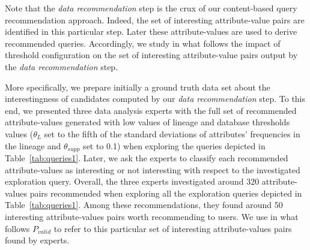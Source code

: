      \begin{table}[t]
 \centering
{}
 \caption{Set of thresholds settings}
 \label{tab:thresh-config}
 \end{table}

Note that the \emph{data recommendation} step is the crux of our content-based query recommendation approach. Indeed, the set of interesting attribute-value pairs  are  identified in this particular step. Later these attribute-values are used to derive recommended queries.
Accordingly, we study in what follows the impact of threshold configuration on the set of interesting attribute-value pairs output by the \emph{data recommendation} step.


More specifically, we prepare initially a ground truth data set about the interestingness of candidates computed by our \emph{data recommendation} step. To this end, we presented three data analysis experts with the full set of recommended attribute-values generated with low values of lineage and database thresholds values ($\theta_{L}$ set to the fifth of the standard deviations of attributes' frequencies in the lineage and $\theta_{supp}$ set to 0.1) when exploring the queries depicted in Table~\ref{tab:queries1}.
Later, we ask the experts to classify each recommended attribute-values as interesting or not interesting with respect to the investigated exploration query.
Overall, the three experts investigated around 320 attribute-values pairs recommended when exploring all the exploration queries depicted in Table~\ref{tab:queries1}. Among these recommendations, they found around 50 interesting attribute-values pairs worth recommending to users. We use in what follows $P_{valid}$ to refer to this particular set of interesting attribute-values pairs found by experts.

